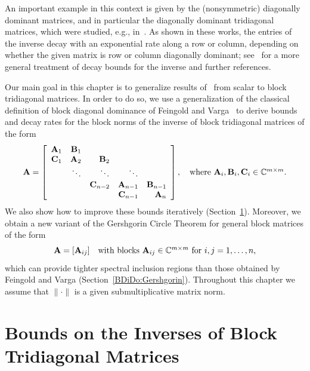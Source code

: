 An important example in this context is given by the (nonsymmetric) diagonally
dominant matrices, and in particular the diagonally dominant tridiagonal
matrices, which were studied, e.g., in~\cite{Nabben99-2,Nabben99}. As shown in
these works, the entries of the inverse decay with an exponential rate along a
row or column, depending on whether the given matrix is row or column
diagonally dominant; see~\cite[\S~3.2]{Ben16} for a more general treatment
of decay bounds for the inverse and further references.

Our main goal in this chapter is to generalize results of~\cite{Nabben99} from
scalar to block tridiagonal matrices. In order to do so, we
use a generalization of the classical definition of block diagonal dominance of
Feingold and Varga~\cite{FeiVar62} to derive bounds and decay rates for the
block norms of the inverse of block tridiagonal matrices of the form
\begin{equation}\label{eq:BDiDo:blocktridiag}
\mathbf{A}=\left[ \begin{array}{crrrr}
\mathbf{A}_1	& 	\mathbf{B}_1 & 					&					 &\\
\mathbf{C}_1	&	\mathbf{A}_2	 & \mathbf{B}_2			&					 &\\
			& \ddots & \ddots 	& \ddots 	 & \\
			&				 & \mathbf{C}_{n-2} & \mathbf{A}_{n-1} & \mathbf{B}_{n-1}\\
			&				 & 					& \mathbf{C}_{n-1} & \mathbf{A}_{n}
\end{array} \right],\quad \mbox{where $\mathbf{A}_i,\mathbf{B}_i,\mathbf{C}_i\in {\mathbb C}^{m\times m}$.}
\end{equation}
We also show how to improve these bounds iteratively (Section~\ref{BDiDo:bounds}).
Moreover, we obtain a new variant of the Gershgorin Circle Theorem for general
block matrices of the form
%
\begin{equation}\label{eq:BDiDo:blockmat}
\mathbf{A}=[\mathbf{A}_{ij}]\quad
\mbox{with blocks $\mathbf{A}_{ij}\in\mathbb{C}^{m\times m}$ for $i,j=1,\dots,n$,}
\end{equation}
which can provide tighter spectral inclusion regions than those
obtained by Feingold and Varga (Section~\ref{BDiDo:Gershgorin}). Throughout
this chapter we assume that $\|\cdot\|$ is a given submultiplicative matrix
norm.


\section{Bounds on the Inverses of Block Tridiagonal Matrices}
\label{BDiDo:bounds}

